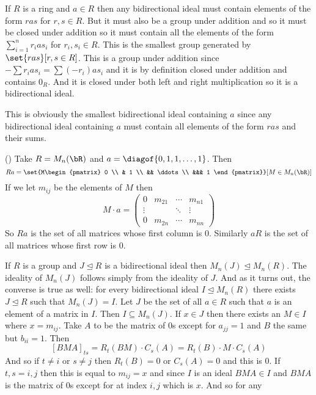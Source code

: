 \documentclass[10pt]{article}
\def\pmat#1{\begin{pmatrix} #1 \end{pmatrix}}
\let\ideal=\trianglelefteq
\begin{document}
\begin{exam*}

    If $R$ is a ring and $a\in R$ then any bidirectional ideal must contain elements of the form $ras$ for $r,s\in R$.
    But it must also be a group under addition and so it must be closed under addition so it must contain all the elements of the form $\sum_{i=1}^n r_ias_i$ for $r_i,s_i\in R$.
    This is the smallest group generated by $\set{ras}[r,s\in R]$.
    This is a group under addition since $-\sum r_ias_i=\sum (-r_i)as_i$ and it is by definition closed under addition and contains $0_R$.
    And it is closed under both left and right multiplication so it is a bidirectional ideal.

    This is obviously the smallest bidirectional ideal containing $a$ since any bidirectional ideal containing $a$ must contain all elements of the form $ras$ and their sums.

\end{exam*}

\begin{exam*}

    ({})
    Take $R=M_n(\bR)$ and $a=\diagof{0, 1, 1, \dots, 1}$.
    Then
    \[ Ra = \set{M\pmat{0 \\ & 1 \\ && \ddots \\ &&& 1}}[M\in M_n(\bR)] \]
    If we let $m_{ij}$ be the elements of $M$ then
    \[ M\cdot a = \pmat{0 & m_{21} & \cdots & m_{n1} \\ \vdots & & \ddots & \vdots \\ 0 & m_{2n} & \cdots & m_{nn}} \]
    So $Ra$ is the set of all matrices whose first column is $0$.
    Similarly $aR$ is the set of all matrices whose first row is $0$.

\end{exam*}

\begin{exam*}

    If $R$ is a group and $J\ideal R$ is a bidirectional ideal then $M_n(J)\ideal M_n(R)$.
    The ideality of $M_n(J)$ follows simply from the ideality of $J$.
    And as it turns out, the converse is true as well: for every bidirectional ideal $I\ideal M_n(R)$ there exists $J\ideal R$ such that $M_n(J)=I$.
    Let $J$ be the set of all $a\in R$ such that $a$ is an element of a matrix in $I$.
    Then $I\subseteq M_n(J)$.
    If $x\in J$ then there exists an $M\in I$ where $x=m_{ij}$.
    Take $A$ to be the matrix of $0$s except for $a_{jj}=1$ and $B$ the same but $b_{ii}=1$.
    Then
    \[ [BMA]_{ts} = R_t(BM)\cdot C_s(A) = R_t(B)\cdot M\cdot C_s(A) \]
    And so if $t\neq i$ or $s\neq j$ then $R_t(B)=0$ or $C_s(A)=0$ and this is $0$.
    If $t,s=i,j$ then this is equal to $m_{ij}=x$ and since $I$ is an ideal $BMA\in I$ and $BMA$ is the matrix of $0$s except for at index $i,j$ which is $x$.
    And so for any 

\end{exam*}
\end{document}
